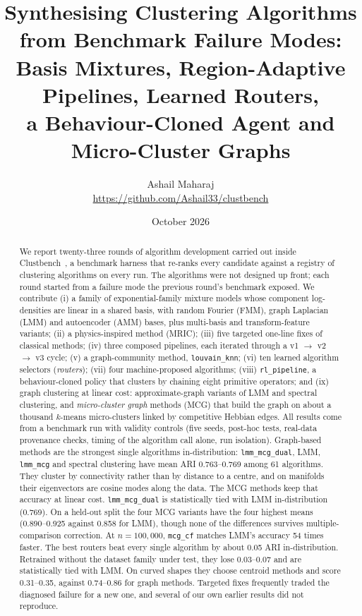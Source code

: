 \documentclass[11pt,a4paper]{article}
\title{\textbf{Synthesising Clustering Algorithms from Benchmark Failure Modes:}\\
\large Basis Mixtures, Region-Adaptive Pipelines, Learned Routers,\\ a Behaviour-Cloned Agent and Micro-Cluster Graphs}
\author{Ashail Maharaj\\\small\url{https://github.com/Ashail33/clustbench}}
\date{October 2026}
\newcommand{\code}[1]{\texttt{#1}}
\begin{document}
\maketitle

\begin{abstract}
We report twenty-three rounds of algorithm development carried out inside
Clustbench~\cite{clustbenchharness}, a benchmark harness that re-ranks every
candidate against a registry of clustering algorithms on every run. The
algorithms were not designed up front; each round started from a failure mode
the previous round's benchmark exposed. We contribute
(i) a family of exponential-family mixture models whose component
log-densities are linear in a shared basis, with random Fourier (FMM), graph
Laplacian (LMM) and autoencoder (AMM) bases, plus multi-basis and
transform-feature variants;
(ii) a physics-inspired method (MRIC);
(iii) five targeted one-line fixes of classical methods;
(iv) three composed pipelines, each iterated through a v1 $\to$ v2 $\to$ v3
cycle;
(v) a graph-community method, \code{louvain\_knn};
(vi) ten learned algorithm selectors (\emph{routers});
(vii) four machine-proposed algorithms;
(viii) \code{rl\_pipeline}, a behaviour-cloned policy that clusters by
chaining eight primitive operators; and
(ix) graph clustering at linear cost: approximate-graph variants of LMM and
spectral clustering, and \emph{micro-cluster graph} methods (MCG) that build
the graph on about a thousand $k$-means micro-clusters linked by
competitive Hebbian edges.
All results come from a benchmark run with validity controls (five seeds,
post-hoc tests, real-data provenance checks, timing of the algorithm call
alone, run isolation). Graph-based methods are the strongest single
algorithms in-distribution: \code{lmm\_mcg\_dual}, LMM, \code{lmm\_mcg} and
spectral clustering have mean ARI 0.763--0.769 among 61 algorithms. They
cluster by connectivity rather than by distance to a centre, and on manifolds
their eigenvectors are cosine modes along the data. The MCG methods keep
that accuracy at linear cost. \code{lmm\_mcg\_dual} is
statistically tied with LMM in-distribution (0.769). On a held-out split the
four MCG variants have the four highest means (0.890--0.925 against 0.858
for LMM), though none of the differences survives multiple-comparison
correction. At $n = 100{,}000$, \code{mcg\_cf} matches LMM's accuracy 54
times faster. The best routers beat every single algorithm by about 0.05
ARI in-distribution. Retrained without the dataset family under test, they
lose 0.03--0.07 and are statistically tied with LMM. On curved shapes they
choose centroid methods and score 0.31--0.35, against 0.74--0.86 for graph
methods. Targeted fixes frequently traded the diagnosed failure for a new
one, and several of our own earlier results did not reproduce.
\end{abstract}
\end{document}
